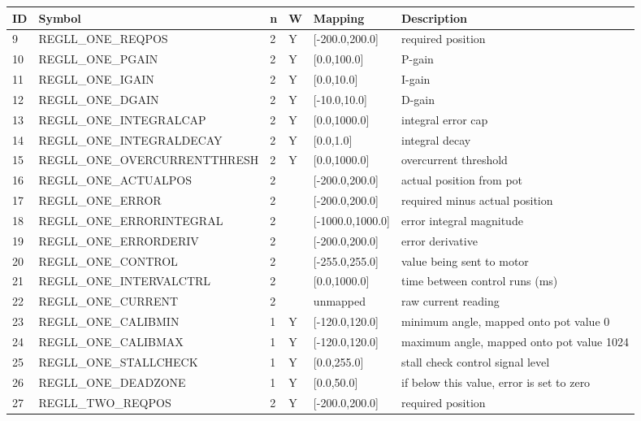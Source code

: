 \begin{tabular}{|p{0.2in}|p{2.7in}|p{0.1in}|p{0.1in}|p{1in}|p{1.5in}|}\hline
\textbf{ID} & \textbf{Symbol} & \textbf{n} & \textbf{W} & \textbf{Mapping} & \textbf{Description}  \\ \hline 
9 & REGLL\_ONE\_REQPOS & 2 & Y & [-200.0,200.0] & required position\\ \hline
10 & REGLL\_ONE\_PGAIN & 2 & Y & [0.0,100.0] & P-gain\\ \hline
11 & REGLL\_ONE\_IGAIN & 2 & Y & [0.0,10.0] & I-gain\\ \hline
12 & REGLL\_ONE\_DGAIN & 2 & Y & [-10.0,10.0] & D-gain\\ \hline
13 & REGLL\_ONE\_INTEGRALCAP & 2 & Y & [0.0,1000.0] & integral error cap\\ \hline
14 & REGLL\_ONE\_INTEGRALDECAY & 2 & Y & [0.0,1.0] & integral decay\\ \hline
15 & REGLL\_ONE\_OVERCURRENTTHRESH & 2 & Y & [0.0,1000.0] & overcurrent threshold\\ \hline
16 & REGLL\_ONE\_ACTUALPOS & 2 &  & [-200.0,200.0] & actual position from pot\\ \hline
17 & REGLL\_ONE\_ERROR & 2 &  & [-200.0,200.0] & required minus actual position\\ \hline
18 & REGLL\_ONE\_ERRORINTEGRAL & 2 &  & [-1000.0,1000.0] & error integral magnitude\\ \hline
19 & REGLL\_ONE\_ERRORDERIV & 2 &  & [-200.0,200.0] & error derivative\\ \hline
20 & REGLL\_ONE\_CONTROL & 2 &  & [-255.0,255.0] & value being sent to motor\\ \hline
21 & REGLL\_ONE\_INTERVALCTRL & 2 &  & [0.0,1000.0] & time between control runs (ms)\\ \hline
22 & REGLL\_ONE\_CURRENT & 2 &  & unmapped & raw current reading\\ \hline
23 & REGLL\_ONE\_CALIBMIN & 1 & Y & [-120.0,120.0] & minimum angle, mapped onto pot value 0\\ \hline
24 & REGLL\_ONE\_CALIBMAX & 1 & Y & [-120.0,120.0] & maximum angle, mapped onto pot value 1024\\ \hline
25 & REGLL\_ONE\_STALLCHECK & 1 & Y & [0.0,255.0] & stall check control signal level\\ \hline
26 & REGLL\_ONE\_DEADZONE & 1 & Y & [0.0,50.0] & if below this value, error is set to zero\\ \hline
27 & REGLL\_TWO\_REQPOS & 2 & Y & [-200.0,200.0] & required position\\ \hline

\end{tabular}
